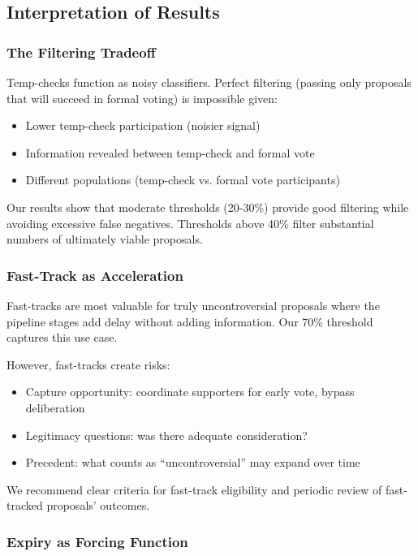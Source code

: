 
\subsection{Interpretation of Results}

\subsubsection{The Filtering Tradeoff}

Temp-checks function as noisy classifiers. Perfect filtering (passing only proposals that will succeed in formal voting) is impossible given:
\begin{itemize}
    \item Lower temp-check participation (noisier signal)
    \item Information revealed between temp-check and formal vote
    \item Different populations (temp-check vs. formal vote participants)
\end{itemize}

Our results show that moderate thresholds (20-30\%) provide good filtering while avoiding excessive false negatives. Thresholds above 40\% filter substantial numbers of ultimately viable proposals.

\subsubsection{Fast-Track as Acceleration}

Fast-tracks are most valuable for truly uncontroversial proposals where the pipeline stages add delay without adding information. Our 70\% threshold captures this use case.

However, fast-tracks create risks:
\begin{itemize}
    \item Capture opportunity: coordinate supporters for early vote, bypass deliberation
    \item Legitimacy questions: was there adequate consideration?
    \item Precedent: what counts as ``uncontroversial'' may expand over time
\end{itemize}

We recommend clear criteria for fast-track eligibility and periodic review of fast-tracked proposals' outcomes.

\subsubsection{Expiry as Forcing Function}

